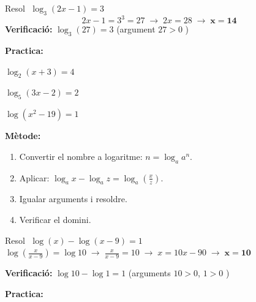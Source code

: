 \documentclass[12pt,a4paper]{article}
\begin{document}
\vspace{0.2cm}

\begin{tcolorbox}[exemplebox]
Resol $\;\log_3(2x - 1) = 3$
\tcblower
\[
2x - 1 = 3^3 = 27 \;\longrightarrow\; 2x = 28 \;\longrightarrow\; \boldsymbol{x = 14}
\]
\textbf{Verificació:} $\log_3(27) = 3$ \checkmark \quad (argument $27 > 0$ \checkmark)
\end{tcolorbox}

\vspace{0.3cm}
\noindent\textbf{Practica:}

\begin{exercicis}
    \item $\log_2(x + 3) = 4$
    \item $\log_5(3x - 2) = 2$
    \item $\log(x^2 - 19) = 1$
\end{exercicis}
\newpage

\begin{metodebox}
\textbf{Mètode:}
\begin{enumerate}[noitemsep, label=\arabic*.]
    \item Convertir el nombre a logaritme: $n = \log_a a^n$.
    \item Aplicar: $\log_a x - \log_a z = \log_a\!\left(\frac{x}{z}\right)$.
    \item Igualar arguments i resoldre. \quad
    \item Verificar el domini.
\end{enumerate}
\end{metodebox}

\vspace{0.2cm}

\begin{tcolorbox}[exemplebox]
Resol $\;\log(x) - \log(x-9) = 1$
\tcblower
$\log\!\left(\frac{x}{x-9}\right) = \log 10 \;\longrightarrow\;
\frac{x}{x-9} = 10 \;\longrightarrow\; x = 10x-90 \;\longrightarrow\; \boldsymbol{x = 10}$

\textbf{Verificació:} $\log 10 - \log 1 = 1$ \checkmark \quad (arguments $10>0$, $1>0$ \checkmark)
\end{tcolorbox}

\vspace{0.3cm}
\noindent\textbf{Practica:}
\end{document}
